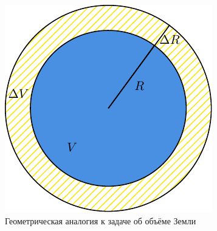 \documentclass[titlepage]{article}
\begin{document}
\begin{figure}[h]
 \centering
 \includegraphics[scale = 0.8]{first3.pdf}
 \caption{Геометрическая аналогия к задаче об объёме Земли}
 \label{fig:4}
\end{figure}
\end{document}
